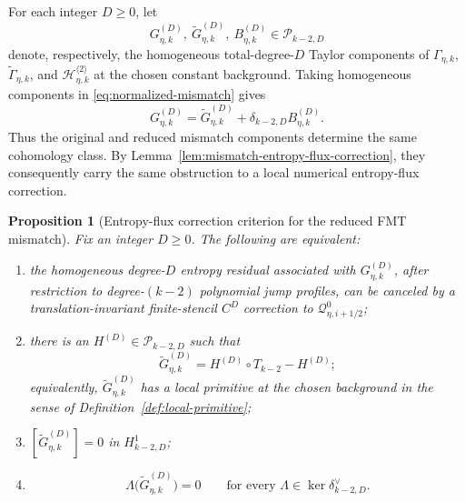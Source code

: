 \documentclass[11pt]{amsart}
\theoremstyle{plain}
\newtheorem{proposition}[theorem]{Proposition}
\theoremstyle{definition}
\theoremstyle{remark}
\numberwithin{equation}{section}
\theoremstyle{plain}
\begin{document}
For each integer $D\ge0$, let
\begin{equation}\label{eq:normalized-mismatch-homogeneous-part}
	G_{\eta,k}^{(D)},\ 
	\widetilde G_{\eta,k}^{(D)},\ 
	B_{\eta,k}^{(D)}
	\in\mathscr P_{k-2,D}
\end{equation}
denote, respectively, the homogeneous total-degree-$D$ Taylor components of
$\Gamma_{\eta,k}$, $\widetilde\Gamma_{\eta,k}$, and
$\mathscr H_{\eta,k}^{\langle2\rangle}$ at the chosen constant background.
Taking homogeneous components in \eqref{eq:normalized-mismatch} gives
\begin{equation}\label{eq:original-reduced-mismatch-coboundary}
	G_{\eta,k}^{(D)}
	=
	\widetilde G_{\eta,k}^{(D)}
	+\delta_{k-2,D}B_{\eta,k}^{(D)}.
\end{equation}
Thus the original and reduced mismatch components determine the same
cohomology class.  By
Lemma~\ref{lem:mismatch-entropy-flux-correction}, they consequently carry the
same obstruction to a local numerical entropy-flux correction.

\begin{proposition}[Entropy-flux correction criterion for the reduced FMT
mismatch]
	\label{prop:fmt-closure}
	Fix an integer $D\ge0$.  The following are equivalent:
	\begin{enumerate}[label=\textup{(\roman*)}]
		\item the homogeneous degree-$D$ entropy residual associated with
		$G_{\eta,k}^{(D)}$, after restriction to degree-$(k-2)$ polynomial jump
		profiles, can be canceled by a translation-invariant finite-stencil
		$C^D$ correction to $\mathcal Q^0_{\eta,i+1/2}$;
		\item there is an $H^{(D)}\in\mathscr P_{k-2,D}$ such that
		\[
			\widetilde G_{\eta,k}^{(D)}
			=H^{(D)}\circ T_{k-2}-H^{(D)};
		\]
		equivalently, $\widetilde G_{\eta,k}^{(D)}$ has a local primitive at the
		chosen background in the sense of Definition~\ref{def:local-primitive};
		\item $[\widetilde G_{\eta,k}^{(D)}]=0$ in $H^1_{k-2,D}$;
		\item
		\begin{equation}\label{eq:polynomial-closure-criterion}
			\Lambda\bigl(\widetilde G_{\eta,k}^{(D)}\bigr)=0
			\qquad\text{for every }
			\Lambda\in\ker\delta_{k-2,D}^{\vee}.
		\end{equation}
	\end{enumerate}
\end{proposition}
\end{document}
